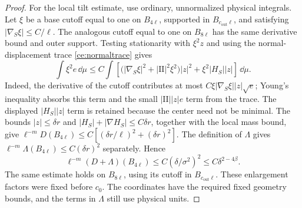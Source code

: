 \begin{proof}
For the local tilt estimate, use ordinary, unnormalized physical
integrals.  Let $\xi$ be a base cutoff equal to one on $B_{4\ell}$,
supported in $B_{c_{\mathrm{out}}\ell}$, and satisfying
$|\nabla_S\xi|\leq C/\ell$.  The analogous cutoff equal to one on
$B_{8\ell}$ has the same derivative bound and outer support.
Testing stationarity with $\xi^2z$
and using the normal-displacement trace \eqref{ce:normaltrace} gives
\[
 \int\xi^2e\,\dd\mu
 \leq C\int\left[
   \bigl(|\nabla_S\xi|^2+|\mathrm{II}|^2\xi^2\bigr)|z|^2
          +\xi^2|H_S||z|\right]\,\dd\mu.
\]
Indeed, the derivative of the cutoff contributes at most
$C\xi|\nabla_S\xi||z|\sqrt e$; Young's inequality absorbs this term
and the small $|\mathrm{II}||z|e$ term from the trace.  The displayed
$|H_S||z|$ term is retained because the center need not be minimal.
The bounds $|z|\leq\delta r$ and
$|H_S|+|\nabla H_S|\leq C\delta r$, together with the local mass
bound, give
$\ell^{-m}D(B_{4\ell})\leq C[(\delta r/\ell)^2+(\delta r)^2]$.
The definition of $\Lambda$ gives
$\ell^{-m}\Lambda(B_{4\ell})\leq C(\delta r)^2$ separately.  Hence
\begin{equation}\label{in:localdensity}
 \ell^{-m}(D+\Lambda)(B_{4\ell})
       \leq C(\delta/\sigma^2)^2
       \leq C\delta^{2-4\beta}.
\end{equation}
The same estimate holds on $B_{8\ell}$, using its cutoff in
$B_{c_{\mathrm{out}}\ell}$.  These enlargement factors were fixed
before $c_0$.
The coordinates have the required fixed geometry bounds, and the terms
in $\Lambda$ still use physical units.


\end{proof}
